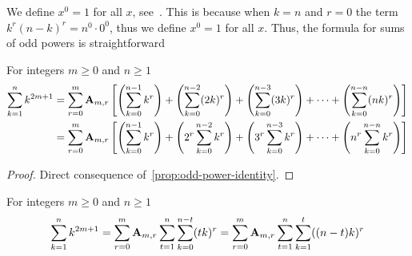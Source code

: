 We define $x^0 = 1$ for all $x$, see~\cite[~p. 162]{graham1994concrete}.
This is because when $k=n$ and $r=0$ the term $k^r (n-k)^r = n^0 \cdot 0^0$, thus we define $x^0 = 1$
for all $x$.
Thus, the formula for sums of odd powers is straightforward
\begin{proposition}
    For integers $m\geq 0$ and $n \geq 1$
    \begin{align*}
        \sum_{k=1}^{n} k^{2m+1}
        &= \sum_{r=0}^{m} {\mathbf{A}} \sb{m,r} \left[ \left( \sum_{k=0}^{n-1} k^r \right) +  \left( \sum_{k=0}^{n-2} (2k)^r \right) + \left( \sum_{k=0}^{n-3} (3k)^r \right)+ \cdots + \left( \sum_{k=0}^{n-n} (nk)^r \right) \right] \\
        &= \sum_{r=0}^{m} {\mathbf{A}} \sb{m,r} \left[ \left( \sum_{k=0}^{n-1} k^r \right) +  \left( 2^r \sum_{k=0}^{n-2} k^r \right) + \left( 3^r \sum_{k=0}^{n-3} k^r \right)+ \cdots + \left( n^r \sum_{k=0}^{n-n} k^r \right) \right]
    \end{align*}
    \begin{proof}
        Direct consequence of~\eqref{prop:odd-power-identity}.
    \end{proof}
\end{proposition}
\begin{corollary}
    For integers $m\geq 0$ and $n \geq 1$
    \begin{align*}
        \sum_{k=1}^{n} k^{2m+1} = \sum_{r=0}^{m} {\mathbf{A}} \sb{m,r} \sum_{t=1}^{n} \sum_{k=0}^{n-t} (tk)^r = \sum_{r=0}^{m} {\mathbf{A}} \sb{m,r} \sum_{t=1}^{n} \sum_{k=1}^{t} ((n-t)k)^r
    \end{align*}
\end{corollary}
